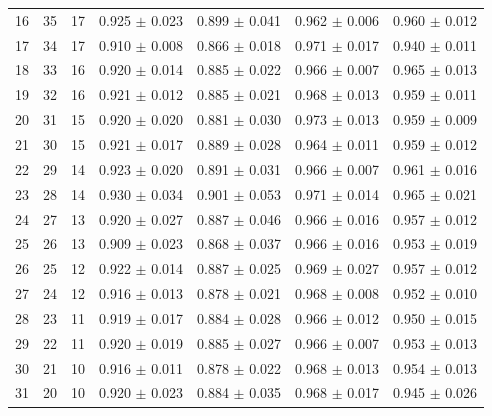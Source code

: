 \begin{table}[H]
\begin{tabular}{l c c c c c c}
      16 & 35 & 17 & 0.925 $\pm$ 0.023 & 0.899 $\pm$ 0.041 & 0.962 $\pm$ 0.006 & 0.960 $\pm$ 0.012\\ 
      17 & 34 & 17 & 0.910 $\pm$ 0.008 & 0.866 $\pm$ 0.018 & 0.971 $\pm$ 0.017 & 0.940 $\pm$ 0.011\\ 
      18 & 33 & 16 & 0.920 $\pm$ 0.014 & 0.885 $\pm$ 0.022 & 0.966 $\pm$ 0.007 & 0.965 $\pm$ 0.013\\ 
      19 & 32 & 16 & 0.921 $\pm$ 0.012 & 0.885 $\pm$ 0.021 & 0.968 $\pm$ 0.013 & 0.959 $\pm$ 0.011\\ 
      20 & 31 & 15 & 0.920 $\pm$ 0.020 & 0.881 $\pm$ 0.030 & 0.973 $\pm$ 0.013 & 0.959 $\pm$ 0.009\\ 
      21 & 30 & 15 & 0.921 $\pm$ 0.017 & 0.889 $\pm$ 0.028 & 0.964 $\pm$ 0.011 & 0.959 $\pm$ 0.012\\ 
      22 & 29 & 14 & 0.923 $\pm$ 0.020 & 0.891 $\pm$ 0.031 & 0.966 $\pm$ 0.007 & 0.961 $\pm$ 0.016\\ 
      23 & 28 & 14 & 0.930 $\pm$ 0.034 & 0.901 $\pm$ 0.053 & 0.971 $\pm$ 0.014 & 0.965 $\pm$ 0.021\\ 
      24 & 27 & 13 & 0.920 $\pm$ 0.027 & 0.887 $\pm$ 0.046 & 0.966 $\pm$ 0.016 & 0.957 $\pm$ 0.012\\ 
      25 & 26 & 13 & 0.909 $\pm$ 0.023 & 0.868 $\pm$ 0.037 & 0.966 $\pm$ 0.016 & 0.953 $\pm$ 0.019\\ 
      26 & 25 & 12 & 0.922 $\pm$ 0.014 & 0.887 $\pm$ 0.025 & 0.969 $\pm$ 0.027 & 0.957 $\pm$ 0.012\\ 
      27 & 24 & 12 & 0.916 $\pm$ 0.013 & 0.878 $\pm$ 0.021 & 0.968 $\pm$ 0.008 & 0.952 $\pm$ 0.010\\ 
      28 & 23 & 11 & 0.919 $\pm$ 0.017 & 0.884 $\pm$ 0.028 & 0.966 $\pm$ 0.012 & 0.950 $\pm$ 0.015\\ 
      29 & 22 & 11 & 0.920 $\pm$ 0.019 & 0.885 $\pm$ 0.027 & 0.966 $\pm$ 0.007 & 0.953 $\pm$ 0.013\\ 
      30 & 21 & 10 & 0.916 $\pm$ 0.011 & 0.878 $\pm$ 0.022 & 0.968 $\pm$ 0.013 & 0.954 $\pm$ 0.013\\ 
      31 & 20 & 10 & 0.920 $\pm$ 0.023 & 0.884 $\pm$ 0.035 & 0.968 $\pm$ 0.017 & 0.945 $\pm$ 0.026\\
      
		\bottomrule
		\hline
	\end{tabular}
	\label{tab:tablamodelos_2layers}
\end{table}


